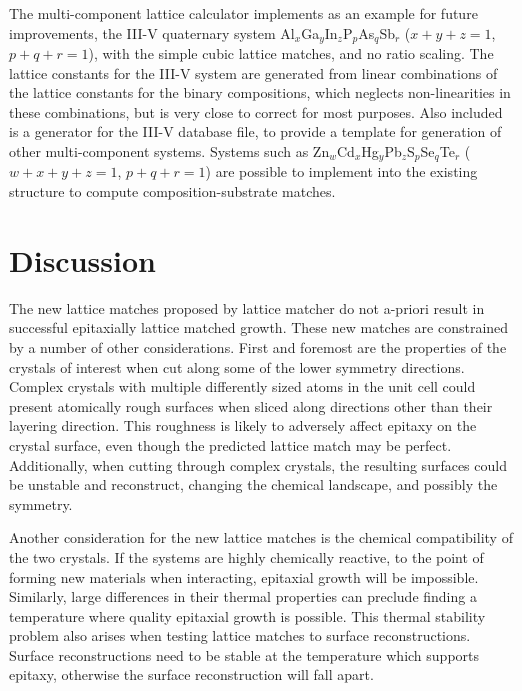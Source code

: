 \documentclass[final,5p,times,twocolumn]{elsarticle}
\begin{document}
The multi-component lattice calculator implements as an example for future improvements, the III-V quaternary system Al$_x$Ga$_y$In$_z$P$_p$As$_q$Sb$_r$ ($x+y+z=1$, $p+q+r=1$), with the simple cubic lattice matches, and no ratio scaling. The lattice constants for the III-V system are generated from linear combinations of the lattice constants for the binary compositions\cite{Ahrenkiel2012}, which neglects non-linearities in these combinations, but is very close to correct for most purposes\cite{Moon1974,Adachi1982}. Also included is a generator for the III-V database file, to provide a template for generation of other multi-component systems. Systems such as Zn$_w$Cd$_x$Hg$_y$Pb$_z$S$_p$Se$_q$Te$_r$ ($w+x+y+z=1$, $p+q+r=1$)  are possible to implement into the existing structure to compute composition-substrate matches.

\section{Discussion}
The new lattice matches proposed by lattice matcher do not a-priori result in successful epitaxially lattice matched growth. These new matches are constrained by a number of other considerations. First and foremost are the properties of the crystals of interest when cut along some of the lower symmetry directions. Complex crystals with multiple differently sized atoms in the unit cell could present atomically rough surfaces when sliced along directions other than their layering direction. This roughness is likely to adversely affect epitaxy on the crystal surface, even though the predicted lattice match may be perfect. Additionally, when cutting through complex crystals, the resulting surfaces could be unstable and reconstruct, changing the chemical landscape, and possibly the symmetry.

Another consideration for the new lattice matches is the chemical compatibility of the two crystals. If the systems are highly chemically reactive, to the point of forming new materials when interacting, epitaxial growth will be impossible. Similarly, large differences in their thermal properties can preclude finding a temperature where quality epitaxial growth is possible. This thermal stability problem also arises when testing lattice matches to surface reconstructions. Surface reconstructions need to be stable at the temperature which supports epitaxy, otherwise the surface reconstruction will fall apart.
\end{document}

